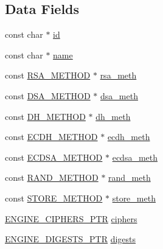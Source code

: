 \subsection*{Data Fields}
\begin{DoxyCompactItemize}
\item 
const char $\ast$ \hyperlink{structengine__st_aeffa2f0815ce90fecbda9aac199143db}{id}
\item 
const char $\ast$ \hyperlink{structengine__st_a8f8f80d37794cde9472343e4487ba3eb}{name}
\item 
const \hyperlink{crypto_2ossl__typ_8h_a559f3eec8932822f887b632e86991995}{R\+S\+A\+\_\+\+M\+E\+T\+H\+OD} $\ast$ \hyperlink{structengine__st_ad79013e496ce0513b7c277a496b12c0d}{rsa\+\_\+meth}
\item 
const \hyperlink{crypto_2ossl__typ_8h_a605b811328e2faab9b3c496ce21e0750}{D\+S\+A\+\_\+\+M\+E\+T\+H\+OD} $\ast$ \hyperlink{structengine__st_a1e95f5d80c41321a15b490356bfb6465}{dsa\+\_\+meth}
\item 
const \hyperlink{crypto_2ossl__typ_8h_a5cc1db56c9b2f76075c0878f65e9b46d}{D\+H\+\_\+\+M\+E\+T\+H\+OD} $\ast$ \hyperlink{structengine__st_a677fbdfebd269974da9fe3cab0f56650}{dh\+\_\+meth}
\item 
const \hyperlink{crypto_2ossl__typ_8h_a74538ccc9d4d6edd4f0e7ccaa99c4064}{E\+C\+D\+H\+\_\+\+M\+E\+T\+H\+OD} $\ast$ \hyperlink{structengine__st_a8add01e68ccbf35d25450337ab8ab068}{ecdh\+\_\+meth}
\item 
const \hyperlink{crypto_2ossl__typ_8h_a9372d671f0f832e3c51b8e308c9ad1aa}{E\+C\+D\+S\+A\+\_\+\+M\+E\+T\+H\+OD} $\ast$ \hyperlink{structengine__st_af29b4fdb92b1208e748fd1aa403bd039}{ecdsa\+\_\+meth}
\item 
const \hyperlink{crypto_2ossl__typ_8h_aec8248984ce6fa1856c2c53f82ba44e2}{R\+A\+N\+D\+\_\+\+M\+E\+T\+H\+OD} $\ast$ \hyperlink{structengine__st_acb9ee109a1e24a1c316dd577c3ac8654}{rand\+\_\+meth}
\item 
const \hyperlink{crypto_2ossl__typ_8h_a2b7bd26e18fe62b90bf46b9d8883386f}{S\+T\+O\+R\+E\+\_\+\+M\+E\+T\+H\+OD} $\ast$ \hyperlink{structengine__st_ab359c37df518f475f4533ec4d0a155b8}{store\+\_\+meth}
\item 
\hyperlink{include_2openssl_2engine_8h_a5743df78c2a3842e727cfdfd3e7b9d12}{E\+N\+G\+I\+N\+E\+\_\+\+C\+I\+P\+H\+E\+R\+S\+\_\+\+P\+TR} \hyperlink{structengine__st_a508e643702b942199faab017f2f8a206}{ciphers}
\item 
\hyperlink{include_2openssl_2engine_8h_a8f57e3470395208f60669f77d35df03b}{E\+N\+G\+I\+N\+E\+\_\+\+D\+I\+G\+E\+S\+T\+S\+\_\+\+P\+TR} \hyperlink{structengine__st_a423fbd4daf36af13fa2398ece16a361f}{digests}

\end{DoxyCompactItemize}
